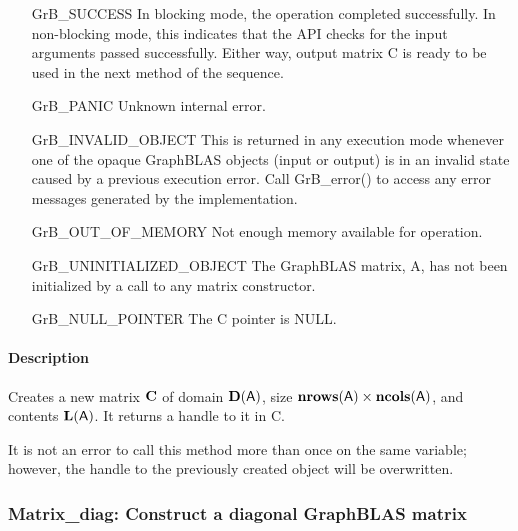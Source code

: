 \begin{itemize}[leftmargin=2.1in]
    \item[{\sf GrB\_SUCCESS}]         In blocking mode, the operation completed
    successfully. In non-blocking mode, this indicates that the API checks 
    for the input arguments passed successfully. Either way, output matrix 
    {\sf C} is ready to be used in the next method of the sequence.

    \item[{\sf GrB\_PANIC}]           Unknown internal error.
    
    \item[{\sf GrB\_INVALID\_OBJECT}] This is returned in any execution mode 
    whenever one of the opaque GraphBLAS objects (input or output) is in an invalid 
    state caused by a previous execution error.  Call {\sf GrB\_error()} to access 
    any error messages generated by the implementation.

    \item[{\sf GrB\_OUT\_OF\_MEMORY}] Not enough memory available for operation.
    
    \item[{\sf GrB\_UNINITIALIZED\_OBJECT}]  The GraphBLAS matrix, {\sf A}, has 
    not been initialized by a call to any matrix constructor.
    
    \item[{\sf GrB\_NULL\_POINTER}]   The {\sf C} pointer is {\sf NULL}.
\end{itemize}

\paragraph{Description}

Creates a new matrix ${\bf C}$ of domain $\mathbf{D}({\sf A})$, size 
$\mathbf{nrows}({\sf A}) \times \mathbf{ncols}({\sf A})$, and contents 
$\mathbf{L}({\sf A})$. It returns a handle to it in {\sf C}.

It is not an error to call this method more than once on the same variable;  
however, the handle to the previously created object will be overwritten. 


\subsubsection{{\sf Matrix\_diag}: Construct a diagonal GraphBLAS matrix }

